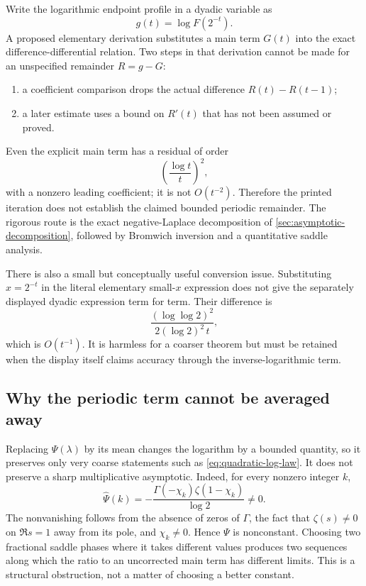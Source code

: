 \documentclass[11pt,oneside]{article}
\theoremstyle{definition}
\theoremstyle{remark}
\begin{document}
Write the logarithmic endpoint profile in a dyadic variable as
\begin{equation}
 g(t)=\log F(2^{-t}).
\end{equation}
A proposed elementary derivation substitutes a main term $G(t)$ into the exact
difference-differential relation.  Two steps in that derivation cannot be made for an
unspecified remainder $R=g-G$:

\begin{enumerate}
\item a coefficient comparison drops the actual difference $R(t)-R(t-1)$;
\item a later estimate uses a bound on $R'(t)$ that has not been assumed or proved.
\end{enumerate}

Even the explicit main term has a residual of order
\begin{equation}
 \left(\frac{\log t}{t}\right)^2,
\end{equation}
with a nonzero leading coefficient; it is not $O(t^{-2})$.  Therefore the printed
iteration does not establish the claimed bounded periodic remainder.  The rigorous route is
the exact negative-Laplace decomposition of \cref{sec:asymptotic-decomposition}, followed by
Bromwich inversion and a quantitative saddle analysis.

There is also a small but conceptually useful conversion issue.  Substituting $x=2^{-t}$ in
the literal elementary small-$x$ expression does not give the separately displayed dyadic
expression term for term.  Their difference is
\begin{equation}
 \frac{(\log\log2)^2}{2(\log2)^2\,t},                     \label{eq:literal-dyadic-discrepancy}
\end{equation}
which is $O(t^{-1})$.  It is harmless for a coarser theorem but must be retained when the
display itself claims accuracy through the inverse-logarithmic term.

\subsection{Why the periodic term cannot be averaged away}

Replacing $\Psi(\lambda)$ by its mean changes the logarithm by a bounded quantity, so it
preserves only very coarse statements such as
\eqref{eq:quadratic-log-law}.  It does not preserve a sharp multiplicative asymptotic.
Indeed, for every nonzero integer $k$,
\begin{equation*}
 \widehat\Psi(k)
 =-\frac{\Gamma(-\chi_k)\zeta(1-\chi_k)}{\log2}\ne0.
\end{equation*}
The nonvanishing follows from the absence of zeros of $\Gamma$, the fact that
$\zeta(s)\ne0$ on $\Re s=1$ away from its pole, and $\chi_k\ne0$.  Hence $\Psi$ is
nonconstant.  Choosing two fractional saddle phases where it takes different values produces
two sequences along which the ratio to an uncorrected main term has different limits.  This
is a structural obstruction, not a matter of choosing a better constant.
\end{document}
